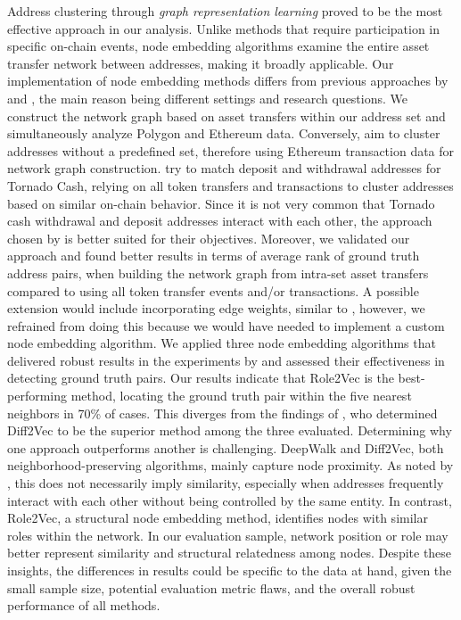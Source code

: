 \documentclass[12pt,a4paper,titlepage,oneside,english]{article}
\begin{document}
Address clustering through \textit{graph representation learning} proved to be the most effective approach in our analysis. Unlike methods that require participation in specific on-chain events, node embedding algorithms examine the entire asset transfer network between addresses, making it broadly applicable. \newline
Our implementation of node embedding methods differs from previous approaches by \cite{Beres2020} and \cite{wu2022tutela}, the main reason being different settings and research questions. We construct the network graph based on asset transfers within our address set and simultaneously analyze Polygon and Ethereum data. \newline
Conversely, \cite{wu2022tutela} aim to cluster addresses without a predefined set, therefore using Ethereum transaction data for network graph construction. \cite{Beres2020} try to match deposit and withdrawal addresses for Tornado Cash, relying on all token transfers and transactions to cluster addresses based on similar on-chain behavior. Since it is not very common that Tornado cash withdrawal and deposit addresses interact with each other, the approach chosen by \cite{Beres2020} is better suited for their objectives. \newline
Moreover, we validated our approach and found better results in terms of average rank of ground truth address pairs, when building the network graph from intra-set asset transfers compared to using all token transfer events and/or transactions. A possible extension would include incorporating edge weights, similar to \cite{wu2022tutela}, however, we refrained from doing this because we would have needed to implement a custom node embedding algorithm.\newline
We applied three node embedding algorithms that delivered robust results in the experiments by \cite{Beres2020} and assessed their effectiveness in detecting ground truth pairs. Our results indicate that Role2Vec is the best-performing method, locating the ground truth pair within the five nearest neighbors in 70\% of cases.  This diverges from the findings of \cite{Beres2020}, who determined Diff2Vec to be the superior method among the three evaluated. \newline
Determining why one approach outperforms another is challenging. DeepWalk and Diff2Vec, both neighborhood-preserving algorithms, mainly capture node proximity. As noted by \cite{ahmed2018roletovec}, this does not necessarily imply similarity, especially when addresses frequently interact with each other without being controlled by the same entity. In contrast, Role2Vec, a structural node embedding method, identifies nodes with similar roles within the network. In our evaluation sample, network position or role may better represent similarity and structural relatedness among nodes. Despite these insights, the differences in results could be specific to the data at hand, given the small sample size, potential evaluation metric flaws, and the overall robust performance of all methods. \newline
\end{document}
